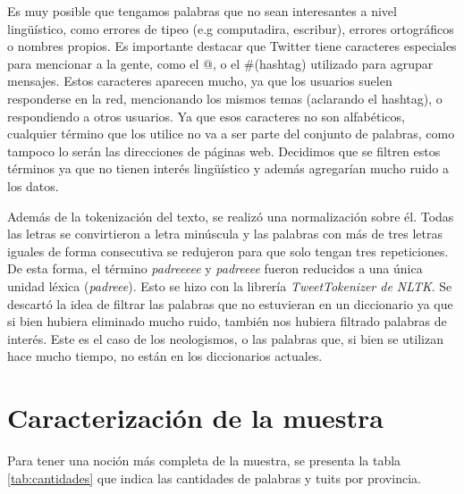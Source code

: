 Es muy posible que tengamos palabras que no sean interesantes a nivel lingüístico, como errores de tipeo (e.g computadira, escribur), errores ortográficos o  nombres propios. Es importante destacar que Twitter tiene caracteres especiales para mencionar a la gente, como el @, o el \#(hashtag) utilizado para agrupar mensajes. Estos caracteres aparecen mucho, ya que los usuarios suelen responderse en la red, mencionando los mismos temas (aclarando el hashtag), o respondiendo a otros usuarios. Ya que esos caracteres no son alfabéticos, cualquier término que los utilice no va a ser parte del conjunto de palabras, como tampoco lo serán las direcciones de páginas web. Decidimos que se filtren estos términos ya que no tienen interés lingüístico y además agregarían mucho ruido a los datos.

Además de la tokenización del texto, se realizó una normalización sobre él. Todas las letras se convirtieron a letra minúscula y las palabras con más de tres letras iguales de forma consecutiva se redujeron para que solo tengan tres repeticiones. De esta forma, el término \textit{padreeeee} y \textit{padreeee} fueron reducidos a una única unidad léxica (\textit{padreee}). Esto se hizo con la librería \textit{TweetTokenizer de NLTK}. 
Se descartó la idea de filtrar las palabras que no estuvieran en un diccionario ya que si bien hubiera eliminado mucho ruido, también nos hubiera filtrado palabras de interés. Este es el caso de los neologismos, o las palabras que, si bien se utilizan hace mucho tiempo, no están en los diccionarios actuales.

\section{Caracterización de la muestra}

Para tener una noción más completa de la muestra, se presenta la tabla \ref{tab:cantidades} que indica las cantidades de palabras y tuits por provincia.


